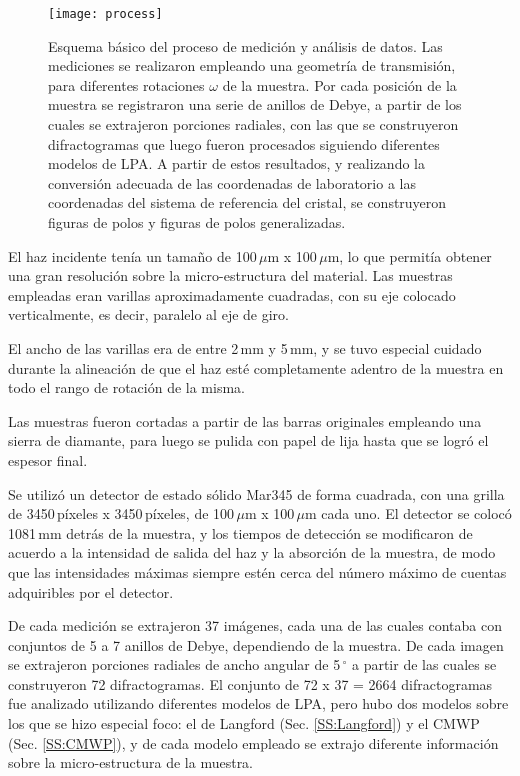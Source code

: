 \begin{figure}[!htb]
  \centering
  \texttt{[image: process]}
  \caption{Esquema básico del proceso de medición y análisis de datos. Las mediciones se realizaron empleando una geometría de transmisión, para diferentes rotaciones $\omega$ de la muestra. Por cada posición de la muestra se registraron una serie de anillos de Debye, a partir de los cuales se extrajeron porciones radiales, con las que se construyeron difractogramas que luego fueron procesados siguiendo diferentes modelos de LPA. A partir de estos resultados, y realizando la conversión adecuada de las coordenadas de laboratorio a las coordenadas del sistema de referencia del cristal, se construyeron figuras de polos y figuras de polos generalizadas.}
  \label{fig:transmision}
\end{figure}


El haz incidente tenía un tamaño de 100\,$\mu$m x 100\,$\mu$m, lo que permitía obtener una gran resolución sobre la micro-estructura del material.
Las muestras empleadas eran varillas aproximadamente cuadradas, con su eje colocado verticalmente, es decir, paralelo al eje de giro.

El ancho de las varillas era de entre 2\,mm y 5\,mm, y se tuvo especial cuidado durante la alineación de que el haz esté completamente adentro de la muestra en todo el rango de rotación de la misma. 

Las muestras fueron cortadas a partir de las barras originales empleando una sierra de diamante, para luego se pulida con papel de lija hasta que se logró el espesor final.

Se utilizó un detector de estado sólido Mar345 de forma cuadrada, con una grilla de 3450\,píxeles x 3450\,píxeles, de 100\,$\mu$m x 100\,$\mu$m cada uno.
El detector se colocó 1081\,mm detrás de la muestra, y los tiempos de detección se modificaron de acuerdo a la intensidad de salida del haz y la absorción de la muestra, de modo que las intensidades máximas siempre estén cerca del número máximo de cuentas adquiribles por el detector.

De cada medición se extrajeron 37 imágenes, cada una de las cuales contaba con conjuntos de 5 a 7 anillos de Debye, dependiendo de la muestra.
De cada imagen se extrajeron porciones radiales de ancho angular de 5\,$^{\circ}$ a partir de las cuales se construyeron 72 difractogramas.
El conjunto de 72 x 37 = 2664 difractogramas fue analizado utilizando diferentes modelos de LPA, pero hubo dos modelos sobre los que se hizo especial foco: el de Langford (Sec. \ref{SS:Langford}) y el CMWP (Sec. \ref{SS:CMWP}), y de cada modelo empleado se extrajo diferente información sobre la micro-estructura de la muestra.

